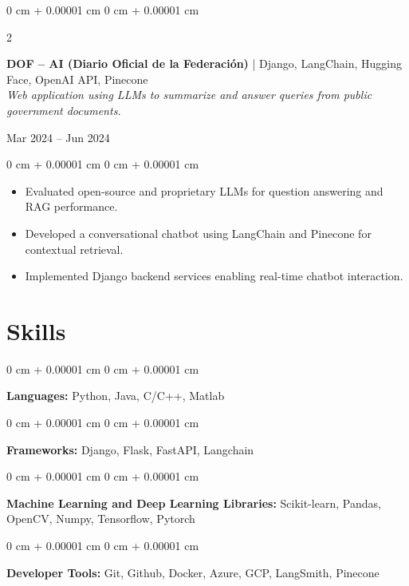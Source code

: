 \documentclass[10pt, letterpaper]{article}
\newenvironment{highlights}{
	\begin{itemize}[
		topsep=0.10 cm,
		parsep=0.10 cm,
		partopsep=0pt,
		itemsep=0pt,
		leftmargin=0 cm + 10pt
		]
	}{
	\end{itemize}
} %
\newenvironment{onecolentry}{
	\begin{adjustwidth}{
			0 cm + 0.00001 cm
		}{
			0 cm + 0.00001 cm
		}
	}{
	\end{adjustwidth}
} %
\newenvironment{twocolentry}[2][]{
	\onecolentry
	\def\secondColumn{#2}
	\setcolumnwidth{\fill, 4.5 cm}
	\begin{paracol}{2}
	}{
		\switchcolumn \raggedleft \secondColumn
	\end{paracol}
	\endonecolentry
} %
\begin{document}
\vspace{0.20 cm}
\begin{twocolentry}{
		Mar 2024 – Jun 2024
	}
	\textbf{DOF – AI (Diario Oficial de la Federación)} | Django, LangChain, Hugging Face, OpenAI API, Pinecone\\
	\textit{Web application using LLMs to summarize and answer queries from public government documents.}
\end{twocolentry}

\vspace{0.10 cm}
\begin{onecolentry}
	\begin{highlights}
		\item Evaluated open-source and proprietary LLMs for question answering and RAG performance.
		\item Developed a conversational chatbot using LangChain and Pinecone for contextual retrieval.
		\item Implemented Django backend services enabling real-time chatbot interaction.
	\end{highlights}
\end{onecolentry}

	
	
	\section{Skills}
	
	
	\begin{onecolentry}
		\textbf{Languages:} Python, Java, C/C++, Matlab
	\end{onecolentry}
	
	\vspace{0.2 cm}
	
	\begin{onecolentry}
		\textbf{Frameworks:} Django, Flask, FastAPI, Langchain
	\end{onecolentry}
	
	\vspace{0.2 cm}
	
	\begin{onecolentry}
		\textbf{Machine Learning and Deep Learning Libraries:} Scikit-learn, Pandas, OpenCV, Numpy, Tensorflow, Pytorch
	\end{onecolentry}
	
	\vspace{0.2 cm}
	
	\begin{onecolentry}
		\textbf{Developer Tools:} Git, Github, Docker, Azure, GCP, LangSmith, Pinecone
	\end{onecolentry}
	
\end{document}
